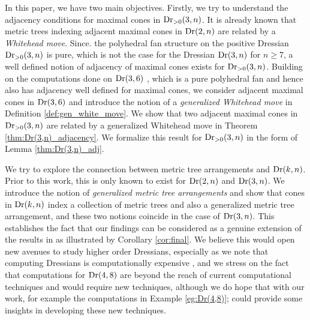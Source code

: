 \documentclass[12pt]{article}
\DeclareMathOperator{\Dr}{\rm Dr}
\theoremstyle{plain}
\theoremstyle{definition}
\numberwithin{subcase}{case}
\begin{document}
In this paper, we have two main objectives. Firstly, we try to understand the adjacency conditions for maximal cones in $\Dr_{>0}(3,n)$.  It is already known that metric trees indexing adjacent maximal cones in
$\Dr(2,n)$ are related by a \emph{Whitehead move}. Since. the polyhedral fan structure on the positive Dressian $\Dr_{>0}(3,n)$ is pure, which is not the case for the Dressian $\Dr(3,n)$ for $n \geq 7$, a well defined notion of adjacency of maximal cones exists for $\Dr_{>0}(3,n)$.
Building on the computations done on $\Dr(3,6)$ \cite{herrmann2009draw}, which is a pure polyhedral fan and hence also has adjacency well defined for maximal cones, we consider adjacent maximal cones in $\Dr(3,6)$ and introduce the notion of a \emph{generalized Whitehead move} in Definition \ref{def:gen_white_move}. We show that two adjacent maximal cones in $\Dr_{>0}(3,n)$ are related by a generalized Whitehead move in Theorem \ref{thm:Dr(3,n)_adjacency}. We formalize this result for $\Dr_{>0}(3,n)$ in the form of Lemma \ref{thm:Dr(3,n)_adj}.


We try to explore the connection between metric tree arrangements and $\Dr(k,n)$. Prior to this work, this is only known to exist for $\Dr(2,n)$ and $\Dr(3,n)$. We introduce the notion of \emph{generalized metric tree arrangements} and show that cones in $\Dr(k,n)$ index a collection of metric trees and also a generalized metric tree arrangement, and these two notions coincide in the case of $\Dr(3,n)$. This establishes the fact that our findings can be considered as a genuine extension of the results in \cite{herrmann2009draw} as illustrated by Corollary \ref{cor:final}. We believe this would open new avenues to study higher order Dressians, especially as we note that computing Dressians is computationally expensive \cite{herrmann2014dressians}, \cite{bendle2020parallel} and we stress on the fact that computations for $\Dr(4,8)$ are beyond the reach of current computational techniques and would require new techniques, although we do hope that with our work, for example the computations in Example \ref{eg:Dr(4,8)}; could provide some insights in developing these new techniques.
\end{document}
